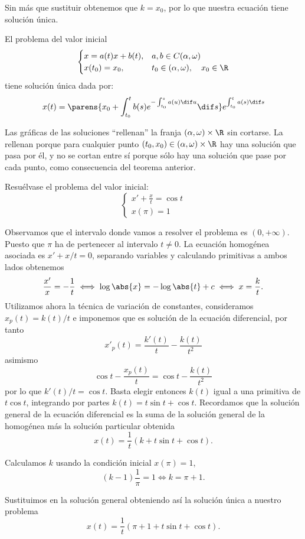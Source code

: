 \documentclass[../main.tex]{subfiles}
\begin{document}
Sin más que sustituir obtenemos que \(k = x_0\), por lo que nuestra ecuación
tiene solución única.

\begin{theorem}
	El problema del valor inicial
	\[
	\begin{cases}
		x = a(t)x + b(t), & a, b \in C(\alpha, \omega) \\
		x(t_0) = x_0, 	  & t_0 \in (\alpha, \omega), \quad x_0 \in \R
	\end{cases}
	\]
	tiene solución única dada por:
	\[x(t) =
		\parens{x_0 + \int_{t_0}^t b(s) e^{-\int_{t_0}^s a(u) \dif u} \dif s}
		e^{\int_{t_0}^t a(s) \dif s}\]
\end{theorem}

Las gráficas de las soluciones ``rellenan'' la franja
\((\alpha, \omega) \times \R\) sin cortarse. La rellenan porque para cualquier
punto \((t_0, x_0) \in (\alpha, \omega) \times \R\) hay una solución que pasa
por él, y no se cortan entre sí porque sólo hay una solución que pase por cada
punto, como consecuencia del teorema anterior.

\begin{example}
	Resuélvase el problema del valor inicial:
	\[
	\begin{cases}
		x' + \frac{x}{t} = \cos t \\
		x(\pi) = 1
	\end{cases}
	\]
\end{example}

\begin{solution}
	Observamos que el intervalo donde vamos a resolver el problema es
	\((0, +\infty)\). Puesto que \(\pi\) ha de pertenecer al intervalo
	\(t \neq 0\). La ecuación homogénea asociada es \(x' + x/t = 0\),
	separando variables y calculando primitivas a ambos lados obtenemos
	\[\frac{x'}{x} = -\frac{1}{t} \iff \log\abs{x}
		= -\log\abs{t} + c \iff x = \frac{k}{t}.\]
	Utilizamos ahora la técnica de variación de constantes, consideramos
	\(x_p(t) = k(t)/t\) e imponemos que es solución de la ecuación diferencial,
	por tanto
	\[x'_p(t) = \frac{k'(t)}{t} - \frac{k(t)}{t^2}\]
	asimismo
	\[\cos t - \frac{x_p(t)}{t} = \cos t - \frac{k(t)}{t^2}\]
	por lo que \(k'(t)/t = \cos t\). Basta elegir entonces \(k(t)\) igual a una
	primitiva de \(t \cos t\), integrando por partes
	\(k(t) = t \sin t + \cos t\). Recordamos que la solución general de la
	ecuación diferencial es la suma de la solución general de la homogénea más
	la solución particular obtenida
	\[x(t) = \frac{1}{t}(k + t \sin t + \cos t).\]

	Calculamos \(k\) usando la condición inicial \(x(\pi) = 1\),
	\[(k - 1)\frac{1}{\pi} = 1 \iff k = \pi + 1.\]

	Sustituimos en la solución general obteniendo así la solución única a
	nuestro problema
	\[x(t) = \frac{1}{t}(\pi + 1 + t \sin t + \cos t).\]
\end{solution}
\end{document}
